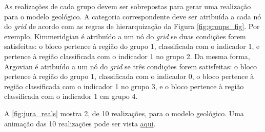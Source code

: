 \begin{figure}[H]
     \hspace{1em}
\end{figure}

As realizações de cada grupo devem ser sobrepostas para gerar uma realização para o modelo geológico. A categoria correspondente deve ser atribuída a cada nó do \textit{grid} de acordo com as regras de hierarquização da Figura \autoref{fig:groups_fig}. Por exemplo, Kimmeridgian é atribuído a um nó do \textit{grid} se duas condições forem satisfeitas: o bloco pertence à região do grupo 1, classificada com o indicador 1, e pertence à região classificada com o indicador 1 no grupo 2. Da mesma forma, Argovian é atribuído a um nó do \textit{grid} se três condições forem satisfeitas: o bloco pertence à região do grupo 1, classificada com o indicador 0, o bloco pertence à região classificada com o indicador 1 no grupo 3, e o bloco pertence à região classificada com o indicador 1 em grupo 4.

A \autoref{fig:jura_reals} mostra 2, de 10 realizações, para o modelo geológico. Uma animação das 10 realizações pode ser vista \href{https://github.com/robertorolo/hierarchical_boundary_simulation/blob/main/jura_gif.gif}{aqui}.

